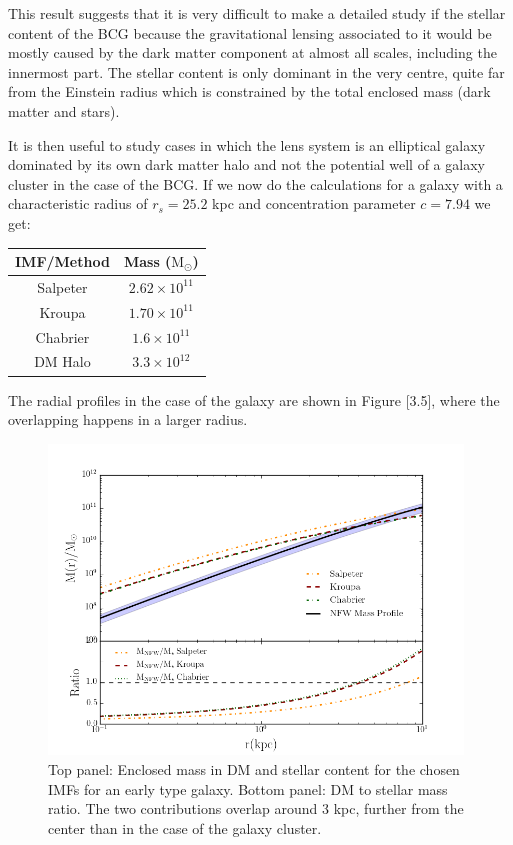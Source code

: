 This result suggests that it is very difficult to make a detailed study if the stellar content of the BCG because the gravitational lensing associated to it would be mostly caused by the dark matter component at almost all scales, including the innermost part. The stellar content is only dominant in the very centre, quite far from the Einstein radius which is constrained by the total enclosed mass (dark matter and stars).

It is then useful to study cases in which the lens system is an elliptical galaxy dominated by its own dark matter halo and not the potential well of a galaxy cluster in the case of the BCG. If we now do the calculations for a galaxy with a characteristic radius of $r_s=25.2$ kpc and concentration parameter $c=7.94$ we get:

\begin{center}
\begin{tabular}{c c}
IMF/Method & Mass ($\text{M}_{\odot}$)\tabularnewline
\hline 
\hline
Salpeter & $2.62\times10^{11}$\tabularnewline
Kroupa & $1.70\times10^{11}$\tabularnewline
Chabrier & $1.6\times10^{11}$\tabularnewline
DM Halo & $3.3\times10^{12}$\tabularnewline
\end{tabular}
\end{center}

The radial profiles in the case of the galaxy are shown in Figure [3.5], where the overlapping happens in a larger radius.

\begin{figure}[]
\centering
\includegraphics[width=11cm]{images/DM_fraction_all_IMFs_galaxy.png}
\caption[DM and Stellar mass profiles for a massive early type galaxy.]{Top panel: Enclosed mass in DM and stellar content for the chosen IMFs for an early type galaxy. Bottom panel: DM to stellar mass ratio. The two contributions overlap around 3 kpc, further from the center than in the case of the galaxy cluster.}
\end{figure}

